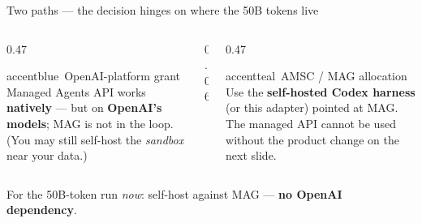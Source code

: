 \begin{frame}{Two paths --- the decision hinges on where the 50B tokens live}
  \begin{columns}[t, totalwidth=\textwidth]
    \begin{column}{0.47\textwidth}
      \begin{featbox}{accentblue}{\faServer\ OpenAI-platform grant}
        \small Managed Agents API works \textbf{natively} --- but on
        \textbf{OpenAI's models}; MAG is not in the loop. (You may still
        self-host the \emph{sandbox} near your data.)
      \end{featbox}
    \end{column}
    \begin{column}{0.06\textwidth}\end{column}
    \begin{column}{0.47\textwidth}
      \begin{featbox}{accentteal}{\faDatabase\ AMSC / MAG allocation}
        \small Use the \textbf{self-hosted Codex harness} (or this adapter)
        pointed at MAG. The managed API cannot be used without the product
        change on the next slide.
      \end{featbox}
    \end{column}
  \end{columns}
  \vspace{12pt}
  \begin{center}
    {\color{midgray}For the 50B-token run \emph{now}: self-host against MAG ---
    \textbf{no OpenAI dependency}.}
  \end{center}
\end{frame}

